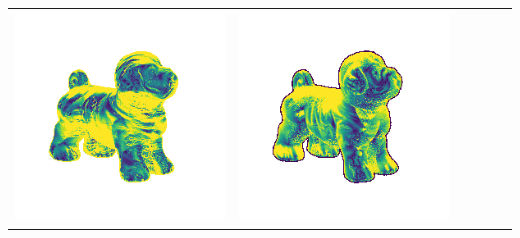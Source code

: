 \begin{center}
\begin{tabularx}{\linewidth}{@{}Y@{}Y@{}Y@{}Y@{}Y@{}Y@{}}
\includegraphics[width=\linewidth]{semisynthetic/20160617_17_yu_err.png} &
\includegraphics[width=\linewidth]{semisynthetic/20160617_17_dpsn_err.png} &

\end{tabularx}
\end{center}
